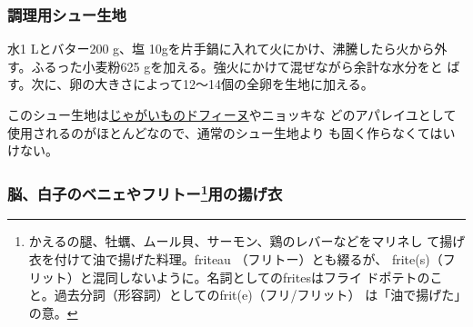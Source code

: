 \begin{recette}
\maeaki

\hypertarget{pate-a-chou-d-office}{%
\subsubsection{調理用シュー生地}\label{pate-a-chou-d-office}}



水1 Lとバター200 g、塩 10gを片手鍋に入れて火にかけ、沸騰したら火から外
す。ふるった小麦粉625 gを加える。強火にかけて混ぜながら余計な水分をと
ばす。次に、卵の大きさによって12〜14個の全卵を生地に加える。

このシュー生地は\protect\hyperlink{pomme-dauphine}{じゃがいものドフィーヌ}やニョッキな
どのアパレイユとして使用されるのがほとんどなので、通常のシュー生地より
も固く作らなくてはいけない。

\maeaki

\hypertarget{pate-a-frire-pour-beignet-de-cervelles}{%
\subsubsection[脳、白子のベニェやフリトー用の揚げ衣]{\texorpdfstring{脳、白子のベニェやフリトー\footnote{かえるの腿、牡蠣、ムール貝、サーモン、鶏のレバーなどをマリネし
  て揚げ衣を付けて油で揚げた料理。friteau （フリトー）とも綴るが、
  frite(s)（フリット）と混同しないように。名詞としてのfritesはフライ
  ドポテトのこと。過去分詞（形容詞）としてのfrit(e)（フリ/フリット）
  は「油で揚げた」の意。}用の揚げ衣}{脳、白子のベニェやフリトー用の揚げ衣}}\label{pate-a-frire-pour-beignet-de-cervelles}}



\end{recette}
